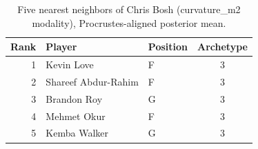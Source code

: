 \begin{table}[htbp]
  \centering\small
  \begin{tabular}{rllc}
    \toprule
    Rank & Player & Position & Archetype \\
    \midrule
    1 & Kevin Love & F & 3 \\
    2 & Shareef Abdur-Rahim & F & 3 \\
    3 & Brandon Roy & G & 3 \\
    4 & Mehmet Okur & F & 3 \\
    5 & Kemba Walker & G & 3 \\
    \bottomrule
  \end{tabular}
  \caption{Five nearest neighbors of Chris Bosh (curvature_m2 modality), Procrustes-aligned posterior mean.}
  \label{tab:Chris_Bosh_neighbors_curvature_m2}
\end{table}

